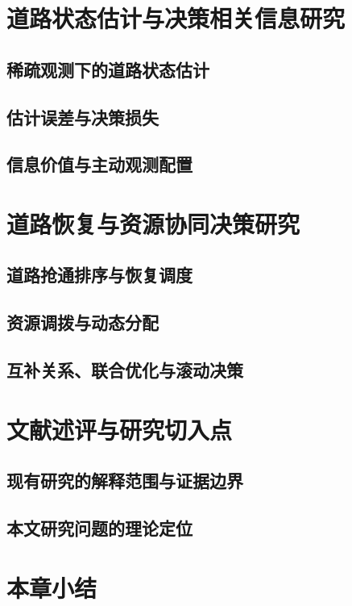 \ThesisBlank

\section{道路状态估计与决策相关信息研究}
\subsection{稀疏观测下的道路状态估计}
\subsection{估计误差与决策损失}
\subsection{信息价值与主动观测配置}

\ThesisBlank

\section{道路恢复与资源协同决策研究}
\subsection{道路抢通排序与恢复调度}
\subsection{资源调拨与动态分配}
\subsection{互补关系、联合优化与滚动决策}

\ThesisBlank

\section{文献述评与研究切入点}
\subsection{现有研究的解释范围与证据边界}
\subsection{本文研究问题的理论定位}

\ThesisBlank

\section{本章小结}
\ThesisBlank
